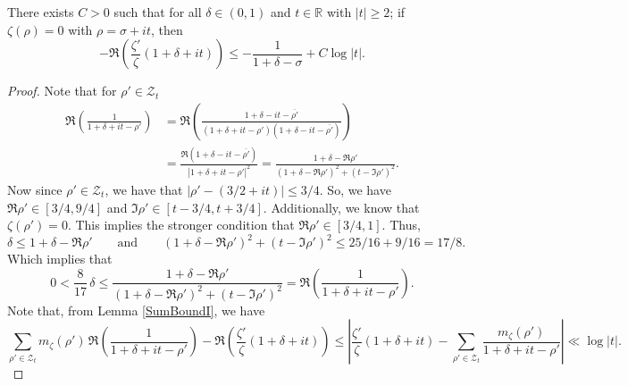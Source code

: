 \begin{theorem}[ShiftOneBound]
\label{ShiftOneBound}
\leanok
There exists $C>0$ such that for all $\delta\in(0,1)$ and $t\in\mathbb{R}$ with
    $|t|\geq 2$; if $\zeta(\rho)=0$ with $\rho=\sigma+it$, then
    $$-\Re \left(\frac{\zeta'}{\zeta}(1+\delta+it)\right)
      \leq -\frac{1}{1+\delta-\sigma}+C\log|t|.$$
\end{theorem}
\begin{proof}
\leanok
Note that for $\rho'\in\mathcal{Z}_t$
    \begin{align*}
      \mathfrak{R}\left(\frac{1}{1+\delta+it-\rho'}\right)&=\mathfrak{R}\left(
      \frac{1+\delta-it-\overline{\rho'}}{(1+\delta+it-\rho')(1+\delta-it-\overline{\rho'})}\right)
      \\
      &=\frac{\mathfrak{R}(1+\delta-it-\overline{\rho'})}{|1+\delta+it-\rho'|^2}
      =\frac{1+\delta-\mathfrak{R}\rho'}{(1+\delta-\mathfrak{R}\rho')^2+(t-\mathfrak{I}\rho')^2}.
    \end{align*}
    Now since $\rho'\in\mathcal{Z}_t$, we have that $|\rho'-(3/2+it)|\leq 3/4$. So, we have
    $\mathfrak{R}\rho'\in[3/4,9/4]$ and $\mathfrak{I}\rho'\in[t-3/4,t+3/4]$. Additionally, we know
    that $\zeta(\rho')=0$. This implies the stronger condition that $\mathfrak{R}\rho'\in[3/4,1]$.
    Thus,
    $$\delta\leq 1+\delta-\mathfrak{R}\rho'
      \qquad\text{and}\qquad
      (1+\delta-\mathfrak{R}\rho')^2+(t-\mathfrak{I}\rho')^2\leq 25/16+9/16=17/8.$$
    Which implies that
    \begin{equation}\label{pickupPoint5}
        0<\frac{8}{17}\,\delta\leq\frac{1+\delta-\mathfrak{R}\rho'}{(1+\delta-\mathfrak{R}\rho')^2
        +(t-\mathfrak{I}\rho')^2}=\mathfrak{R}\left(\frac{1}{1+\delta+it-\rho'}\right).
    \end{equation}
    Note that, from Lemma \ref{SumBoundI}, we have
    $$\sum_{\rho'\in\mathcal{Z}_t}m_\zeta(\rho')\,\mathfrak{R}\left(
      \frac{1}{1+\delta+it-\rho'}\right)-\mathfrak{R}\left(
      \frac{\zeta'}{\zeta}(1+\delta+it)\right)\leq
      \left|\frac{\zeta'}{\zeta}(1+\delta+it)
      -\sum_{\rho'\in\mathcal{Z}_t}\frac{m_\zeta(\rho')}{1+\delta+it-\rho'}\right|\ll\log|t|.$$


\end{proof}
